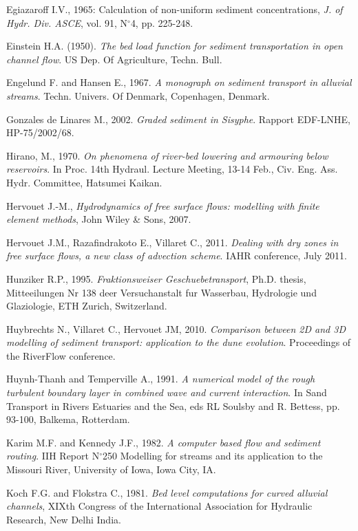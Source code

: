 \begin{thebibliography}{25}
Egiazaroff I.V., 1965: Calculation of non-uniform sediment
concentrations, \emph{J. of Hydr. Div. ASCE}, vol. 91, N$^\circ$4, pp. 225-248.

Einstein H.A. (1950). \emph{The bed load function for sediment
transportation in open channel flow}. US Dep. Of Agriculture, Techn. Bull.

Engelund F. and Hansen E., 1967. \emph{A monograph on sediment transport
in alluvial streams}. Techn. Univers. Of Denmark,
Copenhagen, Denmark. 

Gonzales de Linares M., 2002. \emph{Graded
sediment in Sisyphe}. Rapport EDF-LNHE, HP-75/2002/68.

Hirano, M., 1970. \emph{On phenomena of river-bed lowering and
armouring below reservoirs}. In Proc. 14th Hydraul. Lecture Meeting, 13-14
Feb., Civ. Eng. Ass. Hydr. Committee, Hatsumei Kaikan.

Hervouet J.-M., \emph{Hydrodynamics of free surface flows: modelling with finite element methods}, John Wiley \& Sons, 2007.

Hervouet J.M., Razafindrakoto E., Villaret C., 2011. \emph{Dealing with dry zones
in free surface flows, a new class of advection scheme}. IAHR conference, July 2011.

Hunziker R.P., 1995. \emph{Fraktionsweiser Geschuebetransport},
Ph.D. thesis, Mitteeilungen Nr 138 deer Versuchanstalt fur Wasserbau,
Hydrologie und Glaziologie, ETH Zurich, Switzerland.

Huybrechts N., Villaret C., Hervouet JM, 2010. \emph{Comparison between 2D and 3D
modelling of sediment transport: application to the dune evolution}. Proceedings of the RiverFlow conference.

Huynh-Thanh and Temperville A., 1991. \emph{A numerical model of the
rough turbulent boundary layer in combined wave and current interaction}. In
Sand Transport in Rivers Estuaries and the Sea, eds RL Soulsby and R.
Bettess, pp. 93-100, Balkema, Rotterdam.

Karim M.F. and Kennedy J.F., 1982. \emph{A computer based flow and
sediment routing}. IIH Report N$^\circ$250 Modelling for streams and its
application to the Missouri River, University of Iowa, Iowa City, IA.

Koch F.G. and Flokstra C., 1981. \emph{Bed level computations for
curved alluvial channels}, XIXth Congress of the International Association
for Hydraulic Research, New Delhi India.


\end{thebibliography}
